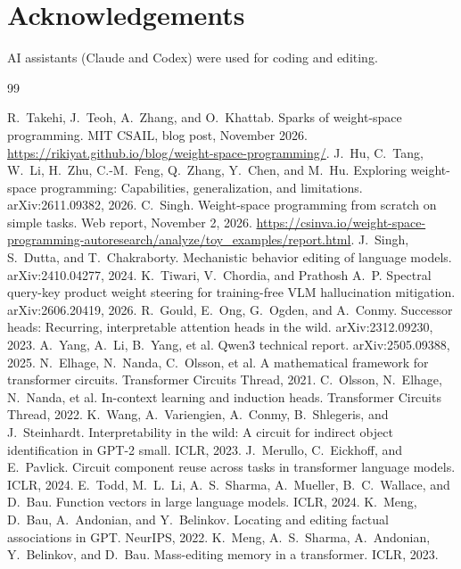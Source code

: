 \documentclass[11pt]{article}
\begin{document}
\section*{Acknowledgements}
AI assistants (Claude and Codex) were used for coding and editing.

\begin{thebibliography}{99}\small\raggedright
{} R.~Takehi, J.~Teoh, A.~Zhang, and O.~Khattab. Sparks of weight-space programming. MIT CSAIL, blog post, November 2026. \url{https://rikiyat.github.io/blog/weight-space-programming/}.
 J.~Hu, C.~Tang, W.~Li, H.~Zhu, C.-M.~Feng, Q.~Zhang, Y.~Chen, and M.~Hu. Exploring weight-space programming: Capabilities, generalization, and limitations. arXiv:2611.09382, 2026.
 C.~Singh. Weight-space programming from scratch on simple tasks. Web report, November 2, 2026. \url{https://csinva.io/weight-space-programming-autoresearch/analyze/toy_examples/report.html}.
 J.~Singh, S.~Dutta, and T.~Chakraborty. Mechanistic behavior editing of language models. arXiv:2410.04277, 2024.
 K.~Tiwari, V.~Chordia, and Prathosh A.~P. Spectral query-key product weight steering for training-free VLM hallucination mitigation. arXiv:2606.20419, 2026.
 R.~Gould, E.~Ong, G.~Ogden, and A.~Conmy. Successor heads: Recurring, interpretable attention heads in the wild. arXiv:2312.09230, 2023.
 A.~Yang, A.~Li, B.~Yang, et al. Qwen3 technical report. arXiv:2505.09388, 2025.
 N.~Elhage, N.~Nanda, C.~Olsson, et al. A mathematical framework for transformer circuits. Transformer Circuits Thread, 2021.
 C.~Olsson, N.~Elhage, N.~Nanda, et al. In-context learning and induction heads. Transformer Circuits Thread, 2022.
 K.~Wang, A.~Variengien, A.~Conmy, B.~Shlegeris, and J.~Steinhardt. Interpretability in the wild: A circuit for indirect object identification in GPT-2 small. ICLR, 2023.
 J.~Merullo, C.~Eickhoff, and E.~Pavlick. Circuit component reuse across tasks in transformer language models. ICLR, 2024.
 E.~Todd, M.~L.~Li, A.~S.~Sharma, A.~Mueller, B.~C.~Wallace, and D.~Bau. Function vectors in large language models. ICLR, 2024.
 K.~Meng, D.~Bau, A.~Andonian, and Y.~Belinkov. Locating and editing factual associations in GPT. NeurIPS, 2022.
 K.~Meng, A.~S.~Sharma, A.~Andonian, Y.~Belinkov, and D.~Bau. Mass-editing memory in a transformer. ICLR, 2023.

\end{thebibliography}
\end{document}
